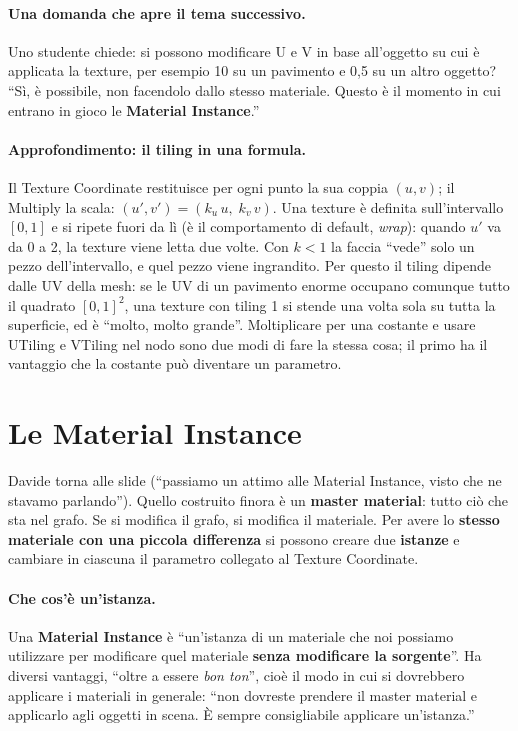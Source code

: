 \paragraph{Una domanda che apre il tema successivo.} Uno studente chiede: si possono
modificare U e V in base all'oggetto su cui è applicata la texture, per esempio 10 su un
pavimento e 0,5 su un altro oggetto? ``Sì, è possibile, non facendolo dallo stesso
materiale. Questo è il momento in cui entrano in gioco le \textbf{Material
Instance}.''

\paragraph{Approfondimento: il tiling in una formula.} Il Texture Coordinate restituisce
per ogni punto la sua coppia $(u, v)$; il Multiply la scala: $(u', v') = (k_u\,u,\;
k_v\,v)$. Una texture è definita sull'intervallo $[0,1]$ e si ripete fuori da lì (è il
comportamento di default, \emph{wrap}): quando $u'$ va da 0 a 2, la texture viene letta
due volte. Con $k < 1$ la faccia ``vede'' solo un pezzo dell'intervallo, e quel pezzo
viene ingrandito. Per questo il tiling dipende dalle UV della mesh: se le UV di un
pavimento enorme occupano comunque tutto il quadrato $[0,1]^2$, una texture con tiling
1 si stende una volta sola su tutta la superficie, ed è ``molto, molto grande''.
Moltiplicare per una costante e usare UTiling e VTiling nel nodo sono due modi di fare
la stessa cosa; il primo ha il vantaggio che la costante può diventare un parametro.

\section{Le Material Instance}
\label{ue3:sec:instance}

Davide torna alle slide (``passiamo un attimo alle Material Instance, visto che ne
stavamo parlando''). Quello costruito finora è un \textbf{master material}: tutto ciò
che sta nel grafo. Se si modifica il grafo, si modifica il materiale. Per avere lo
\textbf{stesso materiale con una piccola differenza} si possono creare due
\textbf{istanze} e cambiare in ciascuna il parametro collegato al Texture Coordinate.

\paragraph{Che cos'è un'istanza.} Una \textbf{Material Instance} è ``un'istanza di un
materiale che noi possiamo utilizzare per modificare quel materiale \textbf{senza
modificare la sorgente}''. Ha diversi vantaggi, ``oltre a essere \emph{bon ton}'', cioè
il modo in cui si dovrebbero applicare i materiali in generale: ``non dovreste prendere
il master material e applicarlo agli oggetti in scena. È sempre consigliabile applicare
un'istanza.''


